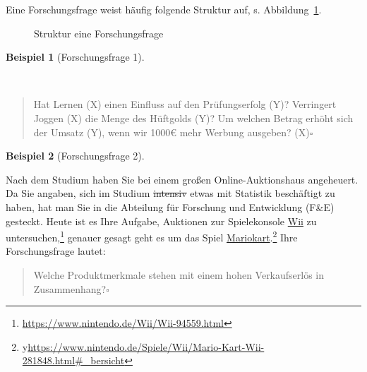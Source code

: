 \documentclass[
  letterpaper,
]{scrbook}
\theoremstyle{definition}
\newtheorem{example}{Beispiel}[chapter]
\theoremstyle{definition}
\theoremstyle{definition}
\theoremstyle{remark}
\begin{document}
Eine Forschungsfrage weist häufig folgende Struktur auf, s.
Abbildung~\ref{fig-fo-struktur}.

\begin{figure}


\caption{\label{fig-fo-struktur}Struktur eine Forschungsfrage}

\end{figure}%

\begin{example}[Forschungsfrage
1]\protect\hypertarget{exm-fofrage1}{}\label{exm-fofrage1}

~

\begin{quote}
Hat Lernen (X) einen Einfluss auf den Prüfungserfolg (Y)? Verringert
Joggen (X) die Menge des Hüftgolds (Y)? Um welchen Betrag erhöht sich
der Umsatz (Y), wenn wir 1000€ mehr Werbung ausgeben? (X)\(\square\)
\end{quote}

\end{example}

\begin{example}[Forschungsfrage
2]\protect\hypertarget{exm-fofrage2}{}\label{exm-fofrage2}

Nach dem Studium haben Sie bei einem großen Online-Auktionshaus
angeheuert. Da Sie angaben, sich im Studium \st{intensiv} etwas mit
Statistik beschäftigt zu haben, hat man Sie in die Abteilung für
Forschung und Entwicklung (F\&E) gesteckt. Heute ist es Ihre Aufgabe,
Auktionen zur Spielekonsole
\href{https://www.nintendo.de/Wii/Wii-94559.html}{Wii} zu
untersuchen,\footnote{\url{https://www.nintendo.de/Wii/Wii-94559.html}}
genauer gesagt geht es um das Spiel
\href{https://www.nintendo.de/Spiele/Wii/Mario-Kart-Wii-281848.html\#_bersicht}{Mariokart}.\footnote{y\url{https://www.nintendo.de/Spiele/Wii/Mario-Kart-Wii-281848.html\#_bersicht}}
Ihre Forschungsfrage lautet:

\begin{quote}
Welche Produktmerkmale stehen mit einem hohen Verkaufserlös in
Zusammenhang?\(\square\)
\end{quote}

\end{example}
\end{document}
